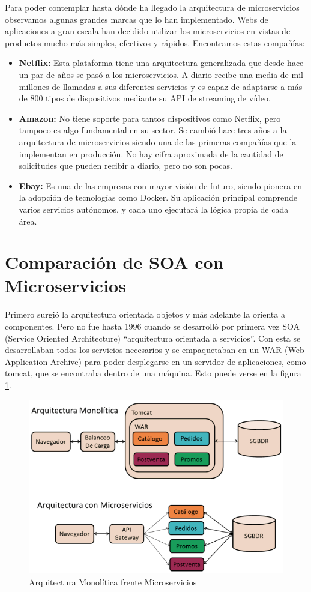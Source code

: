 \documentclass[12pt]{report} %
\begin{document}
Para poder contemplar hasta dónde ha llegado la arquitectura de microservicios observamos algunas grandes marcas que lo han implementado. Webs de aplicaciones a gran escala han decidido utilizar los microservicios en vistas de productos mucho más simples, efectivos y rápidos. Encontramos estas compañías:
\begin{itemize}
	\item \textbf{Netflix:} Esta plataforma tiene una arquitectura generalizada que desde hace un par de años se pasó a los microservicios. A diario recibe una media de mil millones de llamadas a sus diferentes servicios y es capaz de adaptarse a más de 800 tipos de dispositivos mediante su API de streaming de vídeo.
	\item \textbf{Amazon:} No tiene soporte para tantos dispositivos como Netflix, pero tampoco es algo fundamental en su sector. Se cambió hace tres años a la arquitectura de microservicios siendo una de las primeras compañías que la implementan en producción. No hay cifra aproximada de la cantidad de solicitudes que pueden recibir a diario, pero no son pocas. 
	\item \textbf{Ebay:} Es una de las empresas con mayor visión de futuro, siendo pionera en la adopción de tecnologías como Docker. Su aplicación principal comprende varios servicios autónomos, y cada uno ejecutará la lógica propia de cada área.
\end{itemize}




\section{Comparación de SOA con Microservicios}
Primero surgió la arquitectura orientada objetos y más adelante la orienta a componentes. Pero no fue hasta 1996 cuando se desarrolló por primera vez SOA (Service Oriented Architecture) “arquitectura orientada a servicios”. Con esta se desarrollaban todos los servicios necesarios y se empaquetaban en un WAR (Web Application Archive) para poder desplegarse en un servidor de aplicaciones, como tomcat, que se encontraba dentro de una máquina. Esto puede verse en la figura \ref{fig:soavsmicroservicios}.

\begin{figure}
	\centering
	\includegraphics[width=0.7\linewidth]{imagenes/soavsmicroservicios}
	\caption{Arquitectura Monolítica frente Microservicios}
	\label{fig:soavsmicroservicios}
\end{figure}
\end{document}
